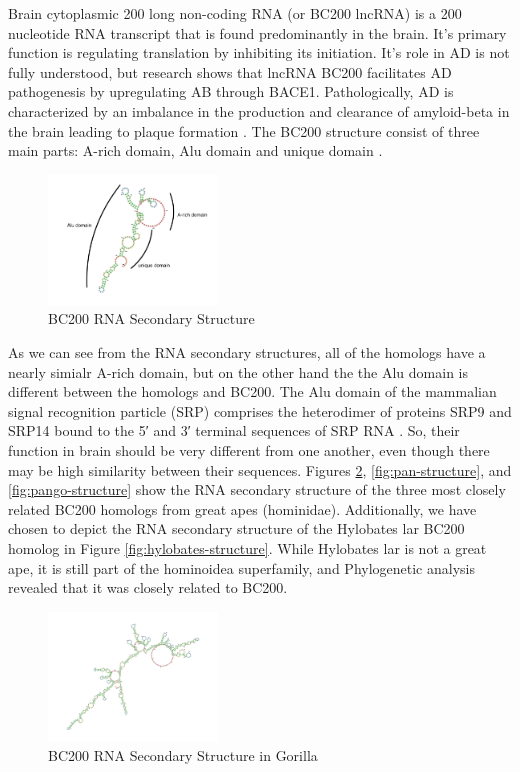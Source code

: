 \documentclass[conference]{IEEEtran}
\begin{document}
Brain cytoplasmic 200 long non-coding RNA (or BC200 lncRNA) is a 200 nucleotide RNA transcript that is found predominantly in the brain. 
It's primary function is regulating translation by inhibiting its initiation. 
It's role in AD is not fully understood, but research shows that lncRNA BC200 facilitates AD pathogenesis by upregulating AB through BACE1. 
Pathologically, AD is characterized by an imbalance in the production and clearance of amyloid-beta in the brain leading to plaque formation \cite{li2018identification}.
The BC200 structure consist of three main parts: A-rich domain, Alu domain and unique domain \cite{jung2014rna}.

\begin{figure}[h]
  \centering
  \includegraphics[width=0.4\textwidth]{figs/rna-6.png}
  \caption{BC200 RNA Secondary Structure}
  \label{fig:bc200-structure}
\end{figure}

As we can see from the RNA secondary structures, all of the homologs have a nearly simialr A-rich domain, but on the other hand the the Alu domain is different between the homologs and BC200. 
The Alu domain of the mammalian signal recognition particle (SRP) comprises the heterodimer of proteins SRP9 and SRP14 bound to the 5′ and 3′ terminal sequences of SRP RNA \cite{weichenrieder2000structure}. 
So, their function in brain should be very different from one another, even though there may be high similarity between their sequences. 
Figures \ref{fig:gorilla-structure}, \ref{fig:pan-structure}, and \ref{fig:pango-structure} show the RNA secondary structure of the three most closely related BC200 homologs from great apes (hominidae). 
Additionally, we have chosen to depict the RNA secondary structure of the Hylobates lar BC200 homolog in Figure \ref{fig:hylobates-structure}. 
While Hylobates lar is not a great ape, it is still part of the hominoidea superfamily, and Phylogenetic analysis revealed that it was closely related to BC200.

\begin{figure}[h]
  \centering
  \includegraphics[width=0.4\textwidth]{figs/rnagorilla.png}
  \caption{BC200 RNA Secondary Structure in Gorilla}
  \label{fig:gorilla-structure}
\end{figure}
\end{document}
